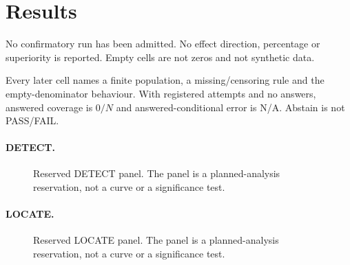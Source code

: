 \section{Results}
\label{sec:results}

No confirmatory run has been admitted. No effect direction, percentage or
superiority is reported. Empty cells are not zeros and not synthetic data.

Every later cell names a finite population, a missing/censoring rule and the
empty-denominator behaviour. With registered attempts and no answers, answered
coverage is \(0/N\) and answered-conditional error is N/A. Abstain is not
PASS/FAIL.

\paragraph{DETECT.}
\begin{figure}[!t]
\centering
{}
\caption{Reserved DETECT panel. The panel is a planned-analysis reservation,
not a curve or a significance test.}
\label{fig:res-detect}
\end{figure}

\paragraph{LOCATE.}
\begin{figure}[!t]
\centering
{}
\caption{Reserved LOCATE panel. The panel is a planned-analysis reservation,
not a curve or a significance test.}
\label{fig:res-locate}
\end{figure}

